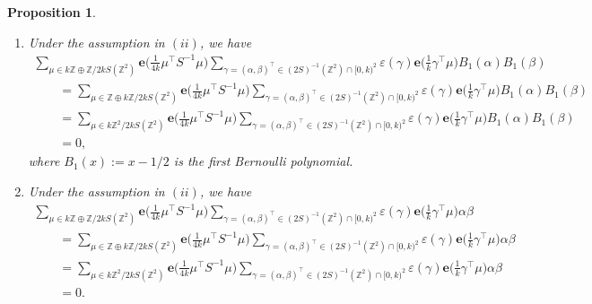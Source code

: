 \documentclass[11pt]{article}
\numberwithin{equation}{section}
\newcommand{\veps}{\varepsilon}
\newcommand{\Z}{\mathbb{Z}}
\numberwithin{equation}{section}
\newtheorem{prop}[Theorem]{Proposition}
 { \theoremstyle{definition}
\newtheorem{dfn}[Theorem]{Definition}
\newtheorem{Note}[Theorem]{Note}
\newtheorem{ex}[Theorem]{Example}
\newtheorem{rem}[Theorem]{Remark}
\newtheorem{assump}[Theorem]{Assumption}
}
\newcommand{\trans}[1]{#1^\top}
\begin{document}
\begin{prop}
\begin{enumerate}
\begin{gather*}
			\sum_{\gamma = \trans{(\alpha, \beta)} \in (2S)^{-1}(\Z^2)/k\Z^2}\!\! \veps(\gamma)
			\bm{e}\bigg(\frac{1}{k} {\trans{\gamma}} \mu\bigg) B(\alpha) C(\beta)
\\ \qquad
			{}= 0.
		\end{gather*}
		\item[$(iv)$] %
		Under the assumption in $(ii)$, we have
		\begin{gather*}
			\sum_{\mu \in k\Z \oplus \Z/2kS(\Z^2)} \bm{e}\bigg(\frac{1}{4k} {\trans{\mu}} S^{-1} \mu\bigg)
			\sum_{\gamma = \trans{(\alpha, \beta)} \in (2S)^{-1}(\Z^2) \cap [0, k)^2} \veps(\gamma)
			\bm{e}\bigg(\frac{1}{k} {\trans{\gamma}} \mu\bigg) B_1(\alpha) B_1(\beta)
\\ \qquad
			{}=
			\sum_{\mu \in \Z \oplus k\Z/2kS(\Z^2)}\!\!\!\!\!\! \bm{e}\bigg(\frac{1}{4k} {\trans{\mu}} S^{-1} \mu\bigg)\!\!\!\!
			\sum_{\gamma = \trans{(\alpha, \beta)} \in (2S)^{-1}(\Z^2) \cap [0, k)^2} \!\!\!\!\!\veps(\gamma)
			\bm{e}\bigg(\frac{1}{k} {\trans{\gamma}} \mu\bigg) B_1(\alpha) B_1(\beta)
\\ \qquad
			{}=
			\sum_{\mu \in k\Z^2/2kS(\Z^2)}\!\!\!\! \bm{e}\bigg(\frac{1}{4k} {\trans{\mu}} S^{-1} \mu\bigg)\!\!\!\!
			\sum_{\gamma = \trans{(\alpha, \beta)} \in (2S)^{-1}(\Z^2) \cap [0, k)^2}\!\!\!\! \veps(\gamma)
			\bm{e}\bigg(\frac{1}{k} {\trans{\gamma}} \mu\bigg) B_1(\alpha) B_1(\beta)
\\ \qquad
			{}= 0,
		\end{gather*}
		where $ B_1(x) := x - 1/2 $ is the first Bernoulli polynomial.
		\item[$(v)$] %
		Under the assumption in $(ii)$, we have
		\begin{gather*}
			\sum_{\mu \in k\Z \oplus \Z/2kS(\Z^2)} \bm{e}\bigg(\frac{1}{4k} {\trans{\mu}} S^{-1} \mu\bigg)
			\sum_{\gamma = \trans{(\alpha, \beta)} \in (2S)^{-1}(\Z^2) \cap [0, k)^2} \veps(\gamma)
			\bm{e}\bigg(\frac{1}{k} {\trans{\gamma}} \mu\bigg) \alpha \beta
\\ \qquad
			{}=
			\sum_{\mu \in \Z \oplus k\Z/2kS(\Z^2)} \bm{e}\bigg(\frac{1}{4k} {\trans{\mu}} S^{-1} \mu\bigg)
			\sum_{\gamma = \trans{(\alpha, \beta)} \in (2S)^{-1}(\Z^2) \cap [0, k)^2} \veps(\gamma)
			\bm{e}\bigg(\frac{1}{k} {\trans{\gamma}} \mu\bigg) \alpha \beta
\\ \qquad
			{}=
			\sum_{\mu \in k\Z^2/2kS(\Z^2)} \bm{e}\bigg(\frac{1}{4k} {\trans{\mu}} S^{-1} \mu\bigg)
			\sum_{\gamma = \trans{(\alpha, \beta)} \in (2S)^{-1}(\Z^2) \cap [0, k)^2} \veps(\gamma)
			\bm{e}\bigg(\frac{1}{k} {\trans{\gamma}} \mu\bigg) \alpha \beta
\\ \qquad
			{}= 0.
	\end{gather*}
	\end{enumerate}
\end{prop}
\end{document}
